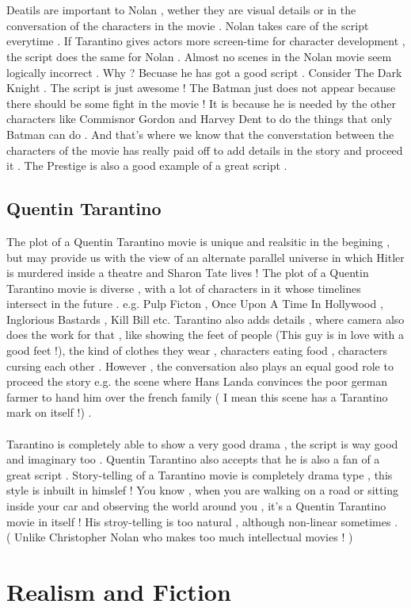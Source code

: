 \documentclass[14pt]{article}
\begin{document}
		\\\\Deatils are important to Nolan , wether they are visual details or in the conversation of the characters in the movie . Nolan takes care of the script everytime . If Tarantino gives actors more screen-time for character development , the script does the same for Nolan . Almost no scenes in the Nolan movie seem logically incorrect . Why ? Becuase he has got a good script . Consider The Dark Knight . The script is just awesome ! The Batman just does not appear because there should be some fight in the movie ! It is because he is needed by the other characters like Commisnor Gordon and Harvey Dent to do the things that only Batman can do . And that's where we know that the converstation between the characters of the movie has really paid off to add details in the story and proceed it . The Prestige is also a good example of a great script .
	\subsection{Quentin Tarantino}
		The plot of a Quentin Tarantino movie is unique and realsitic in the begining , but may provide us with the view of an alternate parallel universe in which Hitler is murdered inside a theatre and Sharon Tate lives ! The plot of a Quentin Tarantino movie is diverse , with a lot of characters in it whose timelines intersect in the future . e.g. Pulp Ficton , Once Upon A Time In Hollywood , Inglorious Bastards , Kill Bill etc. Tarantino also adds details , where camera also does the work for that , like showing the feet of people (This guy is in love with a good feet !), the kind of clothes they wear , characters eating food , characters cursing each other . However , the conversation also plays an equal good role to proceed the story e.g. the scene where Hans Landa convinces the poor german farmer to hand him over the french family ( I mean this scene has a Tarantino mark on itself !) . 
		\\\\Tarantino is completely able to show a very good drama , the script is way good and imaginary too . Quentin Tarantino also accepts that he is also a fan of a great script . Story-telling of a Tarantino movie is completely drama type , this style is inbuilt in himslef ! You know , when you are walking on a road or sitting inside your car and observing the world around you , it's a Quentin Tarantino movie in itself ! His stroy-telling is too natural , although non-linear sometimes . ( Unlike Christopher Nolan who makes too much intellectual movies ! ) 



\section{Realism and Fiction}

	
\end{document}

